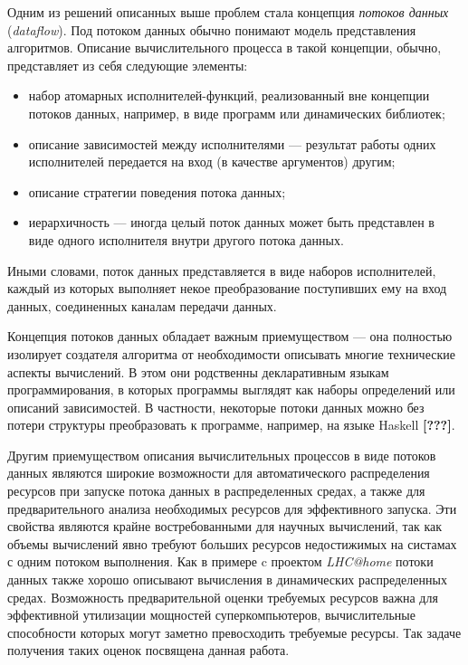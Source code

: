 \documentclass[10pt,a4paper]{article}
\begin{document}
Одним из решений описанных выше проблем стала концепция \textit{потоков данных} (\textit{dataflow}).
Под потоком данных обычно понимают модель представления алгоритмов.
Описание вычислительного процесса в такой концепции, обычно, представляет из себя следующие элементы:
\begin{itemize}
  \item набор атомарных исполнителей-функций, реализованный вне концепции потоков данных, например, в виде программ или динамических библиотек;
  \item описание зависимостей между исполнителями --- результат работы одних исполнителей передается на вход (в качестве аргументов) другим;
  \item описание стратегии поведения потока данных;
  \item иерархичность --- иногда целый поток данных может быть представлен в виде одного исполнителя внутри другого потока данных.
\end{itemize}
Иными словами, поток данных представляется в виде наборов исполнителей, каждый из которых выполняет некое преобразование поступивших ему на вход данных,
соединенных каналам передачи данных.

Концепция потоков данных обладает важным приемуществом --- она полностью изолирует создателя алгоритма от необходимости описывать многие
технические аспекты вычислений. В этом они родственны декларативным языкам программирования, в которых программы выглядят как наборы определений или описаний зависимостей.
В частности, некоторые потоки данных можно без потери структуры преобразовать к программе, например, на языке Haskell \textbf{[???]}.

Другим приемуществом описания вычислительных процессов в виде потоков данных являются широкие возможности для автоматического
распределения ресурсов при запуске потока данных в распределенных средах, а также для предварительного анализа необходимых ресурсов для эффективного запуска.
Эти свойства являются крайне востребованными для научных вычислений, так как объемы вычислений явно требуют больших ресурсов недостижимых на систамах с одним потоком выполнения.
Как в примере c проектом \textit{LHC@home} потоки данных также хорошо описывают вычисления в динамических распределенных средах.
Возможность предварительной оценки требуемых ресурсов важна для эффективной утилизации мощностей суперкомпьютеров,
вычислительные способности которых могут заметно превосходить требуемые ресурсы. Так задаче получения таких оценок посвящена данная работа.
\end{document}
